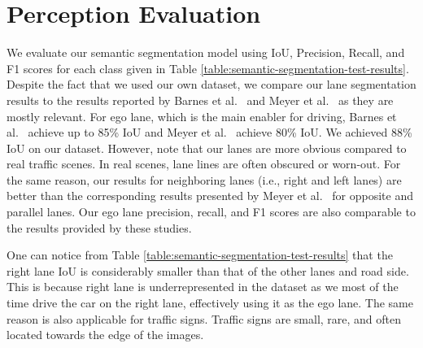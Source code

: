 \section{Perception Evaluation}

We evaluate our semantic segmentation model using IoU, Precision, Recall, and
F1 scores for each class given in Table
\ref{table:semantic-segmentation-test-results}. Despite the fact that we used
our own dataset, we compare our lane segmentation results to the results
reported by Barnes et al.\ \cite{Barnes2016FindYO} and Meyer et al.\
\cite{Meyer2018DeepSL} as they are mostly relevant. For ego lane, which is the
main enabler for driving, Barnes et al.\ \cite{Barnes2016FindYO} achieve up to
85\% IoU and Meyer et al.\ \cite{Meyer2018DeepSL} achieve 80\% IoU. We achieved
88\% IoU on our dataset. However, note that our lanes are more obvious
compared to real traffic scenes. In real scenes, lane lines are often obscured
or worn-out. For the same reason, our results for neighboring lanes (i.e.,
right and left lanes) are better than the corresponding results presented by
Meyer et al.\ \cite{Meyer2018DeepSL} for opposite and parallel lanes. Our ego
lane precision, recall, and F1 scores are also comparable to the results
provided by these studies.

One can notice from Table \ref{table:semantic-segmentation-test-results} that
the right lane IoU is considerably smaller than that of the other lanes and
road side. This is because right lane is underrepresented in the dataset as we
most of the time drive the car on the right lane, effectively using it as the
ego lane. The same reason is also applicable for traffic signs. Traffic signs
are small, rare, and often located towards the edge of the images.

